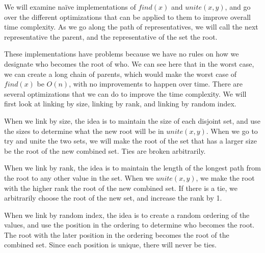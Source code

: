 \documentclass[conference]{IEEEtran}
\begin{document}
We will examine naïve implementations of $find(x)$ and $unite(x, y)$, and go over the different optimizations that can be applied to them to improve overall time complexity. As we go along the path of representatives, we will call the next representative the parent, and the representative of the set the root.





These implementations have problems because we have no rules on how we designate who becomes the root of who. We can see here that in the worst case, we can create a long chain of parents, which would make the worst case of $find(x)$ be $O(n)$, with no improvements to happen over time. There are several optimizations that we can do to improve the time complexity. We will first look at linking by size, linking by rank, and linking by random index.

When we link by size, the idea is to maintain the size of each disjoint set, and use the sizes to determine what the new root will be in $unite(x, y)$. When we go to try and unite the two sets, we will make the root of the set that has a larger size be the root of the new combined set. Ties are broken arbitrarily.



When we link by rank, the idea is to maintain the length of the longest path from the root to any other value in the set. When we $unite(x, y)$, we make the root with the higher rank the root of the new combined set. If there is a tie, we arbitrarily choose the root of the new set, and increase the rank by 1.



When we link by random index, the idea is to create a random ordering of the values, and use the position in the ordering to determine who becomes the root. The root with the later position in the ordering becomes the root of the combined set. Since each position is unique, there will never be ties.
\end{document}

